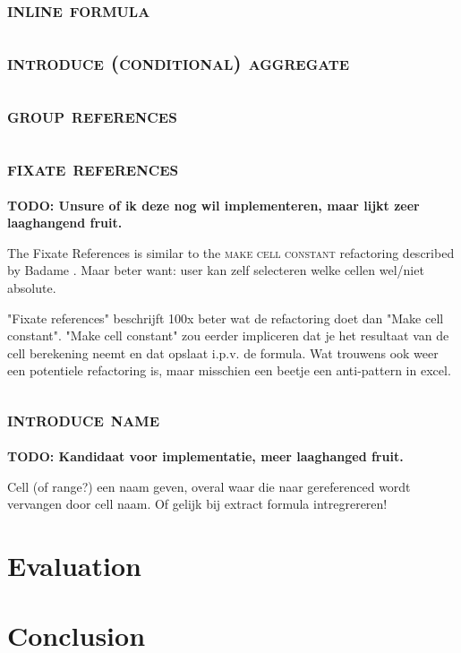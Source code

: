\documentclass[12pt,a4paper,onecolumn,oneside,parskip]{memoir}
\newcommand{\todo}[1]{\textbf{TODO: #1}}
\newcommand{\rf}[1]{\textsc{\lowercase{#1}}}
\begin{document}
\section{\rf{Inline formula}}

\section{\rf{Introduce (Conditional) Aggregate}}

\section{\rf{Group References}}

\section{\rf{Fixate References}}

\todo{Unsure of ik deze nog wil implementeren, maar lijkt zeer laaghangend fruit.}

The Fixate References is similar to the \rf{Make Cell Constant} refactoring described by Badame \cite{badame2012refactoring}.
Maar beter want: user kan zelf selecteren welke cellen wel/niet absolute.

"Fixate references" beschrijft 100x beter wat de refactoring doet dan "Make cell constant". "Make cell constant" zou eerder impliceren dat je het resultaat van de cell berekening neemt en dat opslaat i.p.v. de formula. Wat trouwens ook weer een potentiele refactoring is, maar misschien een beetje een anti-pattern in excel.

\section{\rf{Introduce name}}

\todo{Kandidaat voor implementatie, meer laaghanged fruit.}

Cell (of range?) een naam geven, overal waar die naar gereferenced wordt vervangen door cell naam.
Of gelijk bij extract formula intregrereren!

\chapter{Evaluation}


\chapter{Conclusion}
\end{document}
